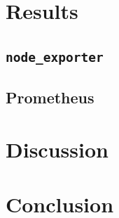 
\section{Results}
\subsection{\texttt{node\_exporter}}
\subsection{Prometheus}

\section{Discussion}

\section{Conclusion}
